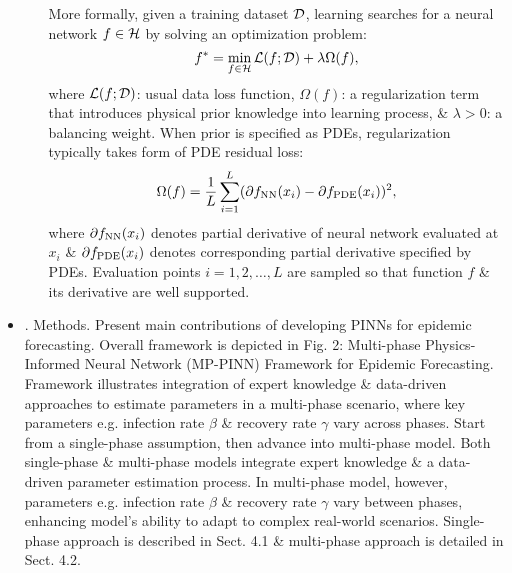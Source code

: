 \documentclass{article}
\begin{document}
\begin{itemize}
\begin{itemize}
		More formally, given a training dataset ${\cal D}$, learning searches for a neural network $f\in{\cal H}$ by solving an optimization problem:
		\begin{equation}
			f^* = \min_{f\in{\cal H}} {\cal L}(f;{\cal D}) + \lambda\Omega(f),
		\end{equation}
		where ${\cal L}(f;{\cal D})$: usual data loss function, $\Omega(f)$: a regularization term that introduces physical prior knowledge into learning process, \& $\lambda > 0$: a balancing weight. When prior is specified as PDEs, regularization typically takes form of PDE residual loss:
		\begin{equation}
			\Omega(f) = \frac{1}{L}\sum_{i=1}^L (\partial f_{\rm NN}(x_i) - \partial f_{\rm PDE}(x_i))^2,
		\end{equation}
		where $\partial f_{\rm NN}(x_i)$ denotes partial derivative of neural network evaluated at $x_i$ \& $\partial f_{\rm PDE}(x_i)$ denotes corresponding partial derivative specified by PDEs. Evaluation points $i = 1,2,\ldots,L$ are sampled so that function $f$ \& its derivative are well supported.
	\end{itemize}
	\item {. Methods.} Present main contributions of developing PINNs for epidemic forecasting. Overall framework is depicted in {\sf Fig. 2: Multi-phase Physics-Informed Neural Network (MP-PINN) Framework for Epidemic Forecasting. Framework illustrates integration of expert knowledge \& data-driven approaches to estimate parameters in a multi-phase scenario, where key parameters e.g. infection rate $\beta$ \& recovery rate $\gamma$ vary across phases.} Start from a single-phase assumption, then advance into multi-phase model. Both single-phase \& multi-phase models integrate expert knowledge \& a data-driven parameter estimation process. In multi-phase model, however, parameters e.g. infection rate $\beta$ \& recovery rate $\gamma$ vary between phases, enhancing model's ability to adapt to complex real-world scenarios. Single-phase approach is described in Sect. 4.1 \& multi-phase approach is detailed in Sect. 4.2.
	

\end{itemize}
\end{document}
